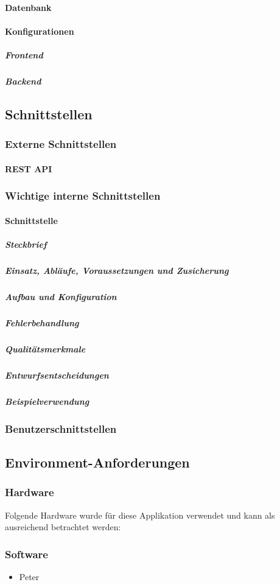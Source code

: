 \paragraph{Datenbank}
\paragraph{Konfigurationen}
\subparagraph{Frontend}

\newpage
\subparagraph{Backend}
\newpage
\subsection{Schnittstellen}

\subsubsection{Externe Schnittstellen}
\paragraph{REST API}

\subsubsection{Wichtige interne Schnittstellen}


\paragraph{Schnittstelle}
\subparagraph{Steckbrief}

\subparagraph{Einsatz, Abläufe, Voraussetzungen und Zusicherung}

\subparagraph{Aufbau und Konfiguration}

\subparagraph{Fehlerbehandlung}

\subparagraph{Qualitätsmerkmale}
\subparagraph{Entwurfsentscheidungen}

\subparagraph{Beispielverwendung}

\subsubsection{Benutzerschnittstellen}

\subsection{Environment-Anforderungen}\label{environmentanforderungen}

\subsubsection{Hardware}
Folgende Hardware wurde für diese Applikation verwendet und kann als ausreichend betrachtet werden:

\subsubsection{Software}

\begin{itemize}
	\item Peter
\end{itemize}
\newpage